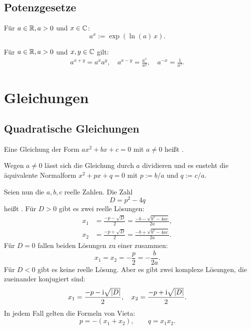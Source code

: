\subsection{Potenzgesetze}
\begin{Definition}
Für $a\in\mathbb R, a>0$ und $x\in\mathbb C$:
\begin{equation}
a^x := \exp(\ln(a)\,x).
\end{equation}
\end{Definition}
\noindent
Für $a\in\mathbb R, a>0$ und $x,y\in\mathbb C$ gilt:
\begin{gather}
a^{x+y} = a^x a^y,\quad a^{x-y} = \frac{a^x}{a^y},
\quad a^{-x} = \frac{1}{a^x}.
\end{gather}

\section{Gleichungen}
\subsection{Quadratische Gleichungen}
{}
Eine Gleichung der Form $ax^2+bx+c=0$ mit $a\ne 0$ heißt
.

Wegen $a\ne 0$ lässt sich die Gleichung durch $a$ dividieren
und es ensteht die äquivalente Normalform $x^2+px+q=0$
mit $p:=b/a$ und $q:=c/a$.

Seien nun die $a,b,c$ reelle Zahlen. Die Zahl
\begin{equation}
D = p^2-4q
\end{equation}
heißt . Für $D>0$ gibt es zwei reelle Lösungen:
\begin{align}
x_1 &= \frac{-p-\sqrt{D}}{2} = \frac{-b-\sqrt{b^2-4ac}}{2a},\\
x_2 &= \frac{-p+\sqrt{D}}{2} = \frac{-b+\sqrt{b^2-4ac}}{2a}.
\end{align}
Für $D=0$ fallen beiden Lösungen zu einer 
zusammen:
\begin{equation}
x_1 = x_2 = -\frac{p}{2} = -\frac{b}{2a}.
\end{equation}
Für $D<0$ gibt es keine reelle Lösung. Aber es gibt zwei komplexe
Lösungen, die zueinander konjugiert sind:
\begin{equation}
x_1 = \frac{-p-\mathrm i\sqrt{|D|}}{2},\quad
x_2 = \frac{-p+\mathrm i\sqrt{|D|}}{2}.
\end{equation}
In jedem Fall gelten die Formeln von Vieta:
\begin{equation}
p = -(x_1+x_2),\qquad q = x_1 x_2.
\end{equation}

